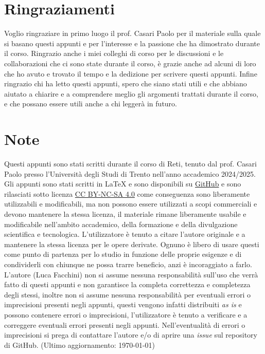 \documentclass[twoside]{report}
\begin{document}
    \section*{Ringraziamenti}
    Voglio ringraziare in primo luogo il prof. Casari Paolo per il materiale sulla quale si basano questi appunti e per l'interesse e la passione che ha dimostrato durante il corso.\newline
    Ringrazio anche i miei colleghi di corso per le discussioni e le collaborazioni che ci sono state durante il corso, è grazie anche ad alcuni di loro che ho avuto e trovato il tempo e la dedizione per scrivere questi appunti.\newline
    Infine ringrazio chi ha letto questi appunti, spero che siano stati utili e che abbiano aiutato a chiarire e a comprendere meglio gli argomenti trattati durante il corso, e che possano essere utili anche a chi leggerà in futuro.
    \vfill
    \footnotesize\section*{Note}
    Questi appunti sono stati scritti durante il corso di Reti, tenuto dal prof. Casari Paolo presso l'Università degli Studi di Trento nell'anno accademico 2024/2025. Gli appunti sono stati scritti in \LaTeX{} e sono disponibili su \href{https://github.com/lucafano04/appuntisecondoanno}{GitHub} e sono rilasciati sotto licenza \href{https://creativecommons.org/licenses/by-nc-sa/4.0/}{CC BY-NC-SA 4.0} come conseguenza sono liberamente utilizzabili e modificabili, ma non possono essere utilizzati a scopi commerciali e devono mantenere la stessa licenza, il materiale rimane liberamente usabile e modificabile nell'ambito accademico, della formazione e della divulgazione scientifica e tecnologica. L'utilizzatore è tenuto a citare l'autore originale e a mantenere la stessa licenza per le opere derivate. Ognuno è libero di usare questi come punto di partenza per lo studio in funzione delle proprie esigenze e di condividerli con chiunque ne possa trarre beneficio, anzi è incoraggiato a farlo.
    L'autore (Luca Facchini) non si assume nessuna responsabilità sull'uso che verrà fatto di questi appunti e non garantisce la completa correttezza e completezza degli stessi, inoltre non si assume nessuna responsabilità per eventuali errori o imprecisioni presenti negli appunti, questi vengono infatti distribuiti \textit{as is} e possono contenere errori o imprecisioni, l'utilizzatore è tenuto a verificare e a correggere eventuali errori presenti negli appunti. Nell'eventualità di errori o imprecisioni si prega di contattare l'autore e/o di aprire una \textit{issue} sul repository di GitHub. (Ultimo aggiornamento: \today)
\end{document}
